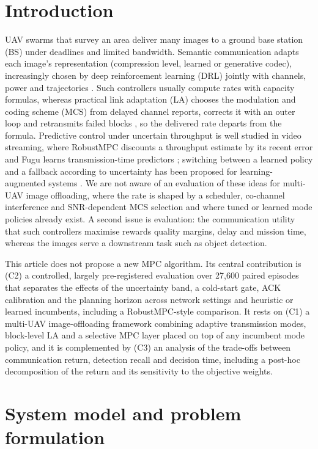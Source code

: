 \documentclass[final,3p,times,twocolumn]{elsarticle}
\begin{document}
\section{Introduction}\label{sec:intro}
UAV swarms that survey an area deliver many images to a ground base station (BS) under deadlines and limited
bandwidth. Semantic communication adapts each image's representation (compression level, learned or generative
codec), increasingly chosen by deep reinforcement learning (DRL) jointly with channels, power and trajectories
\cite{huang2025,si2023,zhao2026}. Such controllers usually compute rates with capacity formulas, whereas practical
link adaptation (LA) chooses the modulation and coding scheme (MCS) from delayed channel reports, corrects it with an
outer loop and retransmits failed blocks \cite{3gpp36213}, so the delivered rate departs from the formula.
Predictive control under uncertain throughput is well studied in video streaming, where RobustMPC discounts a
throughput estimate by its recent error \cite{yin2015} and Fugu learns transmission-time predictors \cite{yan2020};
switching between a learned policy and a fallback according to uncertainty has been proposed for learning-augmented
systems \cite{rotman2020}. We
are not aware of an evaluation of these ideas for multi-UAV image offloading, where the rate is shaped by a
scheduler, co-channel interference and SNR-dependent MCS selection and where tuned or learned mode policies already
exist. A second issue is evaluation: the communication utility that such controllers maximise rewards quality
margins, delay and mission time, whereas the images serve a downstream task such as object detection.

This article does not propose a new MPC algorithm. Its central contribution is (C2) a controlled, largely
pre-registered evaluation over 27,600 paired episodes that separates the effects of the uncertainty band, a
cold-start gate, ACK calibration and the planning horizon across network settings and heuristic or learned
incumbents, including a RobustMPC-style comparison. It rests on (C1) a multi-UAV image-offloading framework combining
adaptive transmission modes, block-level LA and a selective MPC layer placed on top of any incumbent mode policy, and
it is complemented by (C3) an analysis of the trade-offs between communication return, detection recall and decision
time, including a post-hoc decomposition of the return and its sensitivity to the objective weights.

\section{System model and problem formulation}\label{sec:model}
\end{document}
